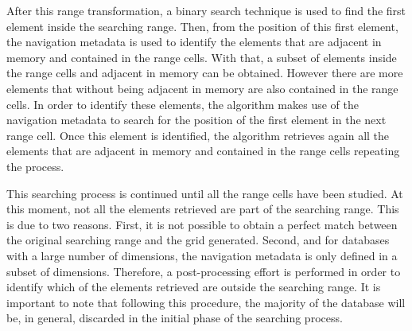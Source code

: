 \documentclass[preprint,12pt]{elsarticle}
\begin{document}
After this range transformation, a binary search technique is used to find the first element inside the searching range. Then, from the position of this first element, the navigation metadata is used to identify the elements that are adjacent in memory and contained in the range cells. With that, a subset of elements inside the range cells and adjacent in memory can be obtained. However there are more elements that without being adjacent in memory are also contained in the range cells. In order to identify these elements, the algorithm makes use of the navigation metadata to search for the position of the first element in the next range cell. Once this element is identified, the algorithm retrieves again all the elements that are adjacent in memory and contained in the range cells repeating the process.

This searching process is continued until all the range cells have been studied. At this moment, not all the elements retrieved are part of the searching range. This is due to two reasons. First, it is not possible to obtain a perfect match between the original searching range and the grid generated. Second, and for databases with a large number of dimensions, the navigation metadata is only defined in a subset of dimensions. Therefore, a post-processing effort is performed in order to identify which of the elements retrieved are outside the searching range. It is important to note that following this procedure, the majority of the database will be, in general, discarded in the initial phase of the searching process.
\end{document}
